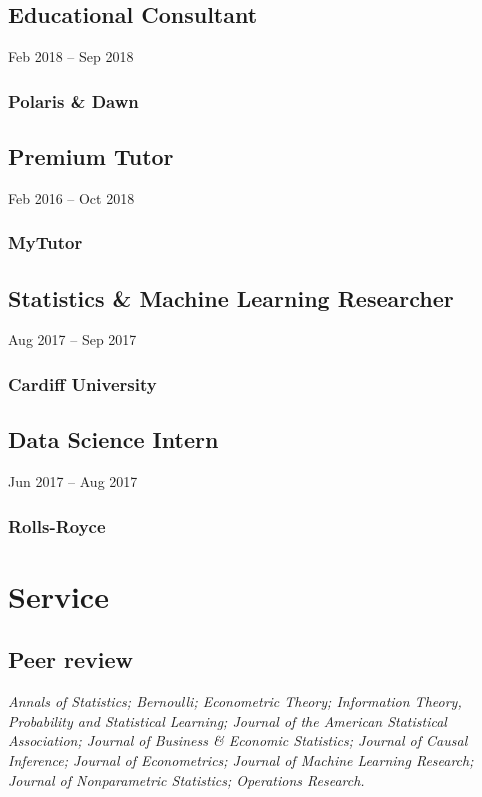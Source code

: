 \documentclass{wgu-cv}
\begin{document}
\subsection{Educational Consultant}
{Feb 2018 -- Sep 2018}
\subsubsection{Polaris \& Dawn}
\vspace{-0.20cm}

\subsection{Premium Tutor}
{Feb 2016 -- Oct 2018}
\subsubsection{MyTutor}
\vspace{-0.20cm}

\subsection{Statistics \& Machine Learning Researcher}
{Aug 2017 -- Sep 2017}
\subsubsection{Cardiff University}
\vspace{-0.20cm}

\subsection{Data Science Intern}
{Jun 2017 -- Aug 2017}
\subsubsection{Rolls-Royce}

\section{Service}

\subsection{Peer review}{}

\emph{%
  Annals of Statistics;
  Bernoulli;
  Econometric Theory;
  Information Theory, Probability and Statistical Learning;
  Journal of the American Statistical Association;
  Journal of Business \& Economic Statistics;
  Journal of Causal Inference;
  Journal of Econometrics;
  Journal of Machine Learning Research;
  Journal of Nonparametric Statistics;
  Operations Research.
}
\end{document}
